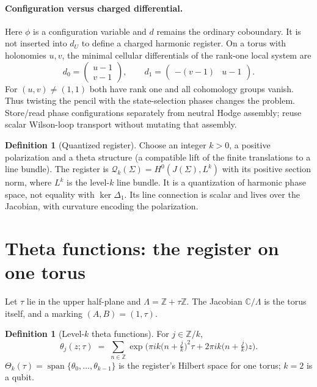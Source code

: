 \documentclass[11pt]{article}
\theoremstyle{definition}
\newtheorem{definition}[theorem]{Definition}
\theoremstyle{remark}
\newcommand{\Z}{\mathbb{Z}}
\newcommand{\C}{\mathbb{C}}
\DeclareMathOperator{\Span}{span}
\begin{document}
\paragraph{Configuration versus charged differential.}
Here $\phi$ is a configuration variable and $d$ remains the ordinary
coboundary. It is not inserted into $d_U$ to define a charged harmonic
register. On a torus with holonomies $u,v$, the minimal cellular
differentials of the rank-one local system are
\[
 d_0=\begin{pmatrix}u-1\\v-1\end{pmatrix},\qquad
 d_1=\begin{pmatrix}-(v-1)&u-1\end{pmatrix}.
\]
For $(u,v)\ne(1,1)$ both have rank one and all cohomology groups vanish.
Thus twisting the pencil with the state-selection phases changes the
problem. Store/read phase configurations separately from neutral Hodge
assembly; reuse scalar Wilson-loop transport without mutating that assembly.

\begin{definition}[Quantized register]
Choose an integer $k>0$, a positive polarization and a theta structure
(a compatible lift of the finite translations to a line bundle). The
register is $\mathcal Q_k(\Sigma)=H^0(J(\Sigma),L^k)$ with its positive
section norm, where $L^k$ is the level-$k$ line bundle. It is a quantization
of harmonic phase space, not equality with $\ker\Delta_1$. Its line
connection is scalar and lives over the Jacobian, with curvature encoding
the polarization.
\end{definition}

\section{Theta functions: the register on one torus}\label{sec:theta}

Let $\tau$ lie in the upper half-plane and $\Lambda = \Z + \tau\Z$. The
Jacobian $\C/\Lambda$ is the torus itself, and a marking $(A,B) = (1,\tau)$.

\begin{definition}[Level-$k$ theta functions]\label{def:theta}
For $j \in \Z/k$,
\[
  \theta_j(z;\tau) \;=\; \sum_{n\in\Z}
  \exp\!\Big(\pi i k\big(n+\tfrac{j}{k}\big)^2\tau + 2\pi i k\big(n+\tfrac{j}{k}\big) z\Big).
\]
$\Theta_k(\tau) = \Span\{\theta_0,\dots,\theta_{k-1}\}$ is the register's
Hilbert space for one torus; $k = 2$ is a qubit.
\end{definition}
\end{document}
